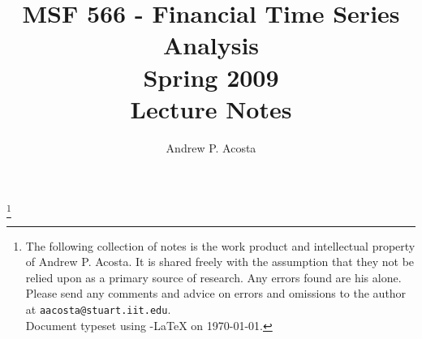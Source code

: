 \documentclass[11pt,twoside]{article}
\begin{document}
\pagestyle{myheadings}
\title{MSF 566 - Financial Time Series Analysis \\ Spring 2009 \\ Lecture Notes}
\author{Andrew P. Acosta}
\date{}

\maketitle
\thanks{The following collection of notes is the work product and intellectual property of Andrew P. Acosta. It is shared freely with the assumption that they not be relied upon as a primary source of research. Any errors found are his alone. Please send any comments and advice on errors and omissions to the author at \texttt{aacosta@stuart.iit.edu}. \\
\tiny{Document typeset using \AmS{}-\LaTeX{} on \today{}.}}

\tableofcontents
\clearpage
\listoffigures

\newpage
\listoftables

\newpage
\listofexamples
\newpage
\listofrpkgs
\cleardoublepage




















\clearpage
{}
\printindex
\end{document}
